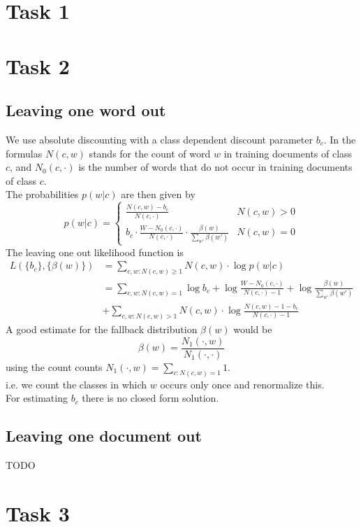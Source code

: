 \documentclass[%
   11pt,              %
   ngerman,           %
   a4paper,           %
   DIV11,             %
]{scrartcl}%
\begin{document}
\section*{Task 1}
\section*{Task 2}
\subsection*{Leaving one word out}
We use absolute discounting with a class dependent discount parameter $b_c$. In the formulas $N(c,w)$ stands for the count of word $w$ in training documents of class $c$, and $N_0(c, \cdot)$ is the number of words that do not occur in training documents of class $c.$\\
The probabilities $p(w|c)$ are then given by
\begin{equation*}
	p(w|c) = 
	\begin{cases}
		\frac{N(c,w) - b_c}{N(c, \cdot)} & N(c,w) > 0 \\
		b_c \cdot \frac{W - N_0(c, \cdot)}{N(c, \cdot)} \cdot \frac{\beta(w)}{\sum_{w'}\beta(w')} & N(c,w) = 0
	\end{cases}
\end{equation*}
The leaving one out likelihood function is
\begin{align*}
	L(\{b_c\},\{\beta(w)\}) &= \sum_{c,w: N(c,w) \geq 1}N(c,w) \cdot \log p(w|c) \\
	&= \sum_{c,w: N(c,w) = 1}\log b_c + \log \frac{W - N_0(c, \cdot)}{N(c,\cdot) - 1} + \log \frac{\beta(w)}{\sum_{w'}\beta(w')} \\
	&+ \sum_{c,w: N(c,w) > 1}N(c,w) \cdot \log \frac{N(c,w) - 1 - b_c}{N(c,\cdot) - 1}
\end{align*}
A good estimate for the fallback distribution $\beta(w)$ would be
\begin{equation*}
	\beta(w) = \frac{N_1(\cdot, w)}{N_1(\cdot, \cdot)}
\end{equation*}
using the count counts $N_1(\cdot, w) = \sum_{c: N(c,w) = 1} 1$.\\
i.e. we count the classes in which $w$ occurs only once and renormalize this. \\
For estimating $b_c$ there is no closed form solution.
\subsection*{Leaving one document out}
TODO
\section*{Task 3}
\end{document}
